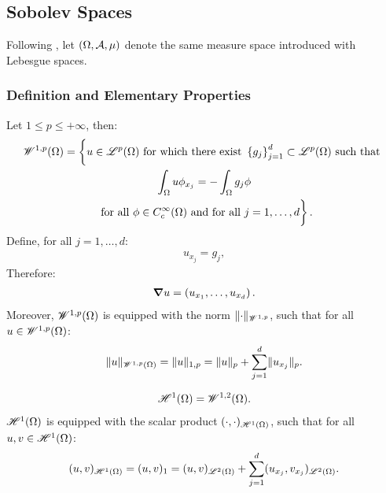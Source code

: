 \newpage
\subsection{Sobolev Spaces}

Following \cite[p. 267]{Brezis2010}, let $(\Omega, \mathcal{A}, \mu)$ denote the same measure space introduced with Lebesgue spaces.

\subsubsection{Definition and Elementary Properties}

\begin{definition}
    Let $1 \leq p \leq +\infty$, then:
    \begin{gather}
        \Wkp{1}{p}(\Omega) = \left\{ \vphantom{\int_{\Omega}} u \in \Lp{p}(\Omega) \text{ for which there exist } \left\{ g_j \right\}_{j = 1}^{d} \subset \Lp{p}(\Omega) \text{ such that } \right. \notag \\ 
        \left. \int_{\Omega} u \phi_{x_j} = - \int_{\Omega} g_j \phi \right. \notag \\
        \left. \text{ for all } \phi \in C_c^{\infty}(\Omega) \text{ and for all } j = 1, \dots, d \vphantom{\int_{\Omega}} \right\}.
    \end{gather}
    Define, for all $j = 1, \dots, d$:
    \begin{gather}
        u_{x_j} = g_j,
    \end{gather}
    Therefore:
    \begin{gather}
        \bm{\nabla} u = \left( u_{x_1}, \dots, u_{x_d} \right).
    \end{gather}
    Moreover, $\mathscr{W}^{1, p}(\Omega)$ is equipped with the norm $\lVert \cdot \rVert_{\mathscr{W}^{1, p}}$, such that for all $u \in \mathscr{W}^{1, p}(\Omega)$:
    \begin{gather}
        \lVert u \rVert_{\mathscr{W}^{1, p}(\Omega)} = \lVert u \rVert_{1, p} = \lVert u \rVert_p + \sum_{j = 1}^d \lVert u_{x_j} \rVert_p.
    \end{gather}
\end{definition}

\begin{definition}[$\Hk{1}(\Omega)$]
    \begin{gather}
        \mathscr{H}^{1}(\Omega) = \mathscr{W}^{1, 2}(\Omega).
    \end{gather}
    $\Hk{1}(\Omega)$ is equipped with the scalar product $(\cdot, \cdot)_{\mathscr{H}^{1}(\Omega)}$, such that for all $u, v \in \mathscr{H}^{1}(\Omega)$:
    \begin{gather}
        (u, v)_{\mathscr{H}^{1}(\Omega)} = (u, v)_1 = (u, v)_{\mathscr{L}^{2}(\Omega)} + \sum_{j = 1}^d (u_{x_j}, v_{x_j})_{\mathscr{L}^{2}(\Omega)}.
    \end{gather}
\end{definition}

